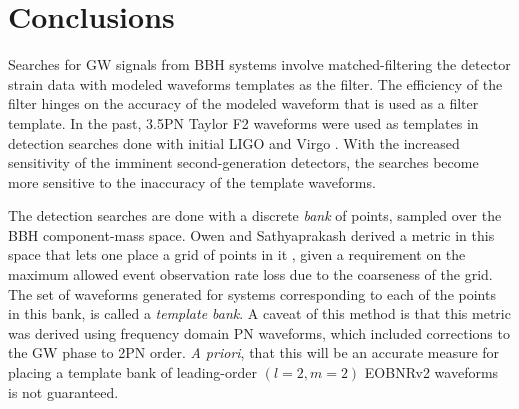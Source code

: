 \documentclass[aps,
prd,
amsmath,
amssymb,
twocolumn,
floatfix,
groupedaddress]{revtex4-1}
\newcommand{\FF}{\mathcal{FF}}
\begin{document}
\section{Conclusions}\label{sec:level1:conclusion}
Searches for GW signals from BBH systems involve matched-filtering the detector strain data with modeled waveforms templates as the filter. The efficiency of the filter hinges on the accuracy of the modeled waveform that is used as a filter template. In the past, 3.5PN Taylor F2 waveforms were used as templates in detection searches done with initial LIGO and Virgo \citep{Colaboration:2011nz,Abadie:2010yb,Abbott:2009qj,Abbott:2009tt,Messaritaki:2005wv}. With the increased sensitivity of the imminent second-generation detectors, the searches become more sensitive to the inaccuracy of the template waveforms. 

The detection searches are done with a discrete \textit{bank} of points, sampled over the BBH component-mass space. Owen and Sathyaprakash \citep{OwenTemplateSpacing,SathyaMetric2PN,SathyaBankPlacementTauN} derived a metric in this space that lets one place a grid of points in it \citep{BabaketalBankPlacement}, given a requirement on the maximum allowed event observation rate loss due to the coarseness of the grid. The set of waveforms generated for systems corresponding to each of the points in this bank, is called a \textit{template bank}. A caveat of this method is that this metric was derived using frequency domain PN waveforms, which included corrections to the GW phase to 2PN order. \textit{A priori}, that this will be an accurate measure for placing a template bank of leading-order $(l=2,m=2)$ EOBNRv2 waveforms is not guaranteed.
\end{document}
